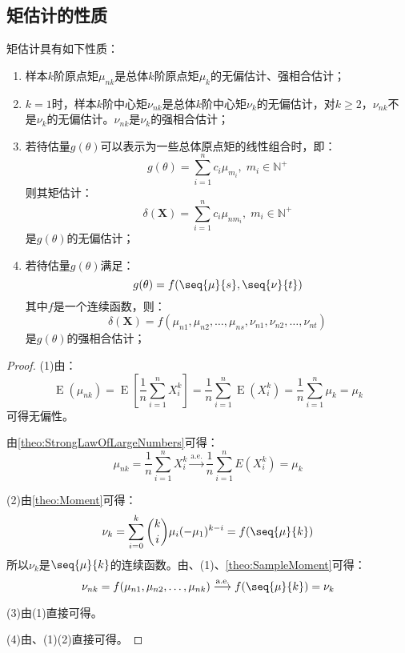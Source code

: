 \subsection{矩估计的性质}
\begin{property}
	矩估计具有如下性质：
	\begin{enumerate}
		\item 样本$k$阶原点矩$\mu_{nk}$是总体$k$阶原点矩$\mu_k$的无偏估计、强相合估计；
		\item $k=1$时，样本$k$阶中心矩$\nu_{nk}$是总体$k$阶中心矩$\nu_k$的无偏估计，对$k\geqslant2$，$\nu_{nk}$不是$\nu_k$的无偏估计。$\nu_{nk}$是$\nu_k$的强相合估计；
		\item 若待估量$g(\theta)$可以表示为一些总体原点矩的线性组合时，即：
		\begin{equation*}
			g(\theta)=\sum_{i=1}^{n}c_i\mu_{m_i},\;m_i\in\mathbb{N}^+
		\end{equation*}
		则其矩估计：
		\begin{equation*}
			\delta(\mathbf{X})=\sum_{i=1}^{n}c_i\mu_{nm_i},\;m_i\in\mathbb{N}^+
		\end{equation*}
		是$g(\theta)$的无偏估计；
		\item 若待估量$g(\theta)$满足：
		\begin{equation*}
			g(\theta)=f(\seq{\mu}{s},\seq{\nu}{t})
		\end{equation*}
		其中$f$是一个连续函数，则：
		\begin{equation*}
			\delta(\mathbf{X})=f(\mu_{n1},\mu_{n2},\dots,\mu_{ns},\nu_{n1},\nu_{n2},\dots,\nu_{nt})
		\end{equation*}
		是$g(\theta)$的强相合估计；
	\end{enumerate}
\end{property}
\begin{proof}
	(1)由：
	\begin{equation*}
		\operatorname{E}(\mu_{nk})=\operatorname{E}\left[\frac{1}{n}\sum_{i=1}^{n}X_i^k\right]=\frac{1}{n}\sum_{i=1}^{n}\operatorname{E}(X_i^k)=\frac{1}{n}\sum_{i=1}^{n}\mu_k=\mu_k
	\end{equation*}
	可得无偏性。\par
	由\cref{theo:StrongLawOfLargeNumbers}可得：
	\begin{equation*}
		\mu_{nk}=\frac{1}{n}\sum_{i=1}^{n}X_i^k\overset{\text{a.e.}}{\longrightarrow}\frac{1}{n}\sum_{i=1}^{n}E(X_i^k)=\mu_k
	\end{equation*}\par
	(2)由\cref{theo:Moment}可得：
	\begin{equation*}
		\nu_k=\sum_{i=0}^{k}\binom{k}{i}\mu_i(-\mu_1)^{k-i}=f(\seq{\mu}{k})
	\end{equation*}
	所以$\nu_k$是$\seq{\mu}{k}$的连续函数。由、(1)、\cref{theo:SampleMoment}可得：
	\begin{equation*}
		\nu_{nk}=f(\mu_{n1},\mu_{n2},\dots,\mu_{nk})\overset{\text{a.e.}}{\longrightarrow}f(\seq{\mu}{k})=\nu_{k}
	\end{equation*}\par
	(3)由(1)直接可得。\par
	(4)由、(1)(2)直接可得。
\end{proof}